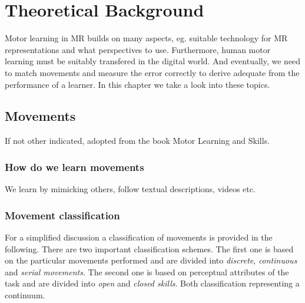 \chapter{Theoretical Background}

Motor learning in MR builds on many aspects, eg. suitable technology for MR representations and what perspectives to use. Furthermore, human motor learning must be suitably transfered in the digital world. And eventually, we need to match movements and measure the error correctly to derive adequate from the performance of a learner. In this chapter we take a look into these topics. 

\section{Movements}
If not other indicated, adopted from the book Motor Learning and Skills\cite{Schmidt2011}.
\subsection{How do we learn movements}
We learn by mimicking others, follow textual descriptions, videos etc. \todo 

\subsection{Movement classification}
For a simplified discussion a classification of movements is provided in the following. There are two important classification schemes. The first one is based on the particular movements performed and are divided into \textit{discrete}, \textit{continuous} and \textit{serial movements}. The second one is based on perceptual attributes of the task and are divided into \textit{open} and \textit{closed skills}. Both classification representing a continuum.

